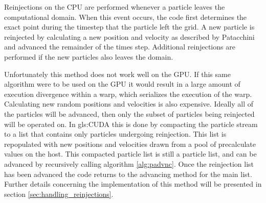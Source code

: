 Reinjections on the CPU are performed whenever a particle leaves the computational domain. When this event occurs, the code first determines the exact point during the timestep that the particle left the grid. A new particle is reinjected by calculating a new position and velocity as described by Patacchini \cite{Patacchini2007} and advanced the remainder of the times step. Additional reinjections are performed if the new particles also leaves the domain. 

Unfortunately this method does not work well on the GPU. If this same algorithm were to be used on the GPU it would result in a large amount of execution divergence within a warp, which serializes the execution of the warp. Calculating new random positions and velocities is also expensive. Ideally all of the particles will be advanced, then only the subset of particles being reinjected will be operated on. In \gls{gls:CUDA} this is done by compacting the particle stream to a list that contains only particles undergoing reinjection. This list is repopulated with new positions and velocities drawn from a pool of precalculate values on the host. This compacted particle list is still a particle list, and can be advanced by recursively calling algorithm \ref{alg:padvnc}. Once the reinjection list has been advanced the code returns to the advancing method for the main list. Further details concerning the implementation of this method will be presented in section \ref{sec:handling_reinjections}.





